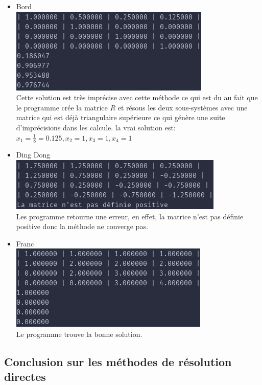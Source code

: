 \documentclass[a4paper]{article}
\begin{document}
\begin{itemize}
\item Bord \\
  \includegraphics[scale=0.5]{./img/cholesky/bord.png} \\
  Cette solution est très imprécise avec cette méthode ce qui est du au fait que
  le programme crée la matrice $R$ et résous les deux sous-systèmes avec une
  matrice qui est déjà triangulaire supérieure ce qui génère une suite
  d'imprécisions dans les calcule. la vrai solution est:
  $x_{1} = \frac{1}{8} = 0.125 , x_{2} = 1 , x_{3} = 1 , x_{4} = 1$
\item Ding Dong \\
  \includegraphics[scale=0.5]{./img/cholesky/ding_dong.png} \\
  Les programme retourne une erreur, en effet, la matrice n'est pas définie
  positive donc la méthode ne converge pas.
\item Franc \\
  \includegraphics[scale=0.5]{./img/cholesky/franc.png} \\
  Le programme trouve la bonne solution.
\end{itemize}

\subsection{Conclusion sur les méthodes de résolution directes}
\end{document}
